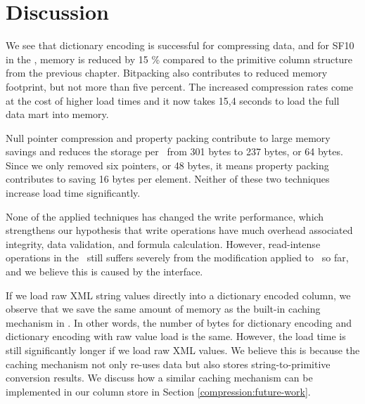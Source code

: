 \section{Discussion}
\label{sec:compression-discussion}
We see that dictionary encoding is successful for compressing data, and for SF10 in the \tpchdl, memory is reduced by 15 \% compared to the primitive column structure from the previous chapter. Bitpacking also contributes to reduced memory footprint, but not more than five percent. The increased compression rates come at the cost of higher load times and it now takes 15,4 seconds to load the full data mart into memory.

Null pointer compression and property packing contribute to large memory savings and reduces the storage per \lineitem~from 301 bytes to 237 bytes, or 64 bytes. Since we only removed six pointers, or 48 bytes, it means property packing contributes to saving 16 bytes per element. Neither of these two techniques increase load time significantly.

None of the applied techniques has changed the write performance, which strengthens our hypothesis that write operations have much overhead associated integrity, data validation, and formula calculation. However, read-intense operations in the \tpchdl~still suffers severely from the modification applied to \gap~so far, and we believe this is caused by the  interface.

If we load raw XML string values directly into a dictionary encoded column, we observe that we save the same amount of memory as the built-in caching mechanism in \gap. In other words, the number of bytes for dictionary encoding and dictionary encoding with raw value load is the same. However, the load time is still significantly longer if we load raw XML values. We believe this is because the caching mechanism not only re-uses data but also stores string-to-primitive conversion results. We discuss how a similar caching mechanism can be implemented in our column store in Section \ref{compression:future-work}.


